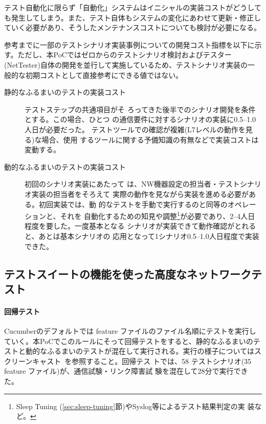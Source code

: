 テスト自動化に限らず「自動化」システムはイニシャルの実装コストがどうして
も発生してしまう。また、テスト自体もシステムの変化にあわせて更新・修正し
ていく必要があり、そうしたメンテナンスコストについても検討が必要になる。

参考までに一部のテストシナリオ実装事例についての開発コスト指標を以下に示
す。ただし、本PoCではゼロからのテストシナリオ検討およびテスター
(NetTester)自体の開発を並行して実施しているため、テストシナリオ実装の一
般的な初期コストとして直接参考にできる値ではない。
\begin{description}
 \item[静的なふるまいのテストの実装コスト] テストステップの共通項目がそ
            ろってきた後半でのシナリオ開発を条件とする。この場合、ひとつ
            の通信要件に対するシナリオの実装に0.5--1.0人日が必要だった。
            テストツールでの確認が複雑(L7レベルの動作を見る)な場合、使用
            するツールに関する予備知識の有無などで実装コストは変動する。
 \item[動的なふるまいのテストの実装コスト] 初回のシナリオ実装にあたって
            は、NW機器設定の担当者・テストシナリオ実装の担当者をそろえて
            実際の動作を見ながら実装を進める必要がある。初回実装では、動
            的なテストを手動で実行するのと同等のオペレーションと、それを
            自動化するための知見や調整\footnote{Sleep Tuning
            (\ref{sec:sleep-tuning}節)やSyslog等によるテスト結果判定の実
            装など。}が必要であり、2--4人日程度を要した。一度基本となる
            シナリオが実装できて動作確認がとれると、あとは基本シナリオの
            応用となって1シナリオ0.5--1.0人日程度で実装できた。
\end{description}

  \subsection{テストスイートの機能を使った高度なネットワークテスト}

    \paragraph{回帰テスト}
Cucumberのデフォルトでは feature ファイルのファイル名順にテストを実行し
ていく。本PoCでこのルールにそって回帰テストをすると、静的なふるまいのテ
ストと動的なふるまいのテストが混在して実行される。実行の様子についてはス
クリーンキャスト~\cite{nettester-asciinema-full}を参照すること。回帰テス
トでは、58 テストシナリオ(35 feature ファイル)が、通信試験・リンク障害試
験を混在して28分で実行できた。

